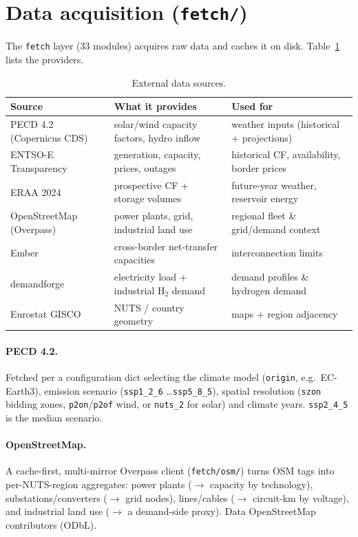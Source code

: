 \documentclass[11pt,a4paper]{article}
\begin{document}
\section{Data acquisition (\texttt{fetch/})}
The \texttt{fetch} layer (33 modules) acquires raw data and caches it on disk. Table~\ref{tab:sources}
lists the providers.

\begin{table}[ht]
\centering
\caption{External data sources.}
\label{tab:sources}
\small
\begin{tabular}{@{}lll@{}}
\toprule
\textbf{Source} & \textbf{What it provides} & \textbf{Used for} \\
\midrule
PECD 4.2 (Copernicus CDS) & solar/wind capacity factors, hydro inflow & weather inputs (historical + projections) \\
ENTSO-E Transparency      & generation, capacity, prices, outages    & historical CF, availability, border prices \\
ERAA 2024                 & prospective CF + storage volumes         & future-year weather, reservoir energy \\
OpenStreetMap (Overpass)  & power plants, grid, industrial land use   & regional fleet \& grid/demand context \\
Ember                     & cross-border net-transfer capacities      & interconnection limits \\
demandforge               & electricity load + industrial H$_2$ demand & demand profiles \& hydrogen demand \\
Eurostat GISCO            & NUTS / country geometry                    & maps + region adjacency \\
\bottomrule
\end{tabular}
\end{table}

\paragraph{PECD 4.2.} Fetched per a configuration dict selecting the climate model (\texttt{origin},
e.g.\ EC-Earth3), emission scenario (\texttt{ssp1\_2\_6} \dots \texttt{ssp5\_8\_5}), spatial resolution
(\texttt{szon} bidding zones, \texttt{p2on}/\texttt{p2of} wind, or \texttt{nuts\_2} for solar) and
climate years. \texttt{ssp2\_4\_5} is the median scenario.

\paragraph{OpenStreetMap.} A cache-first, multi-mirror Overpass client (\texttt{fetch/osm/}) turns OSM
tags into per-NUTS-region aggregates: power plants ($\to$ capacity by technology), substations/converters
($\to$ grid nodes), lines/cables ($\to$ circuit-km by voltage), and industrial land use ($\to$ a
demand-side proxy). Data \textcopyright{} OpenStreetMap contributors (ODbL).
\end{document}
